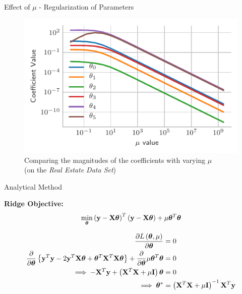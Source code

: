 \documentclass{beamer}
\begin{document}
\begin{frame}{Effect of $\mu$ - Regularization of Parameters}
\vspace{0.4cm}
\begin{figure}\includegraphics[width=0.8\linewidth]{../assets/ridge-regression/figures/rid_reg-with-lim.pdf}\caption{Comparing the magnitudes of the coefficients with varying $\mu$\\(on the \emph{Real Estate Data Set})}
\end{figure}
\end{frame}

\begin{frame}{Analytical Method}
\begin{tcolorbox}
\textbf{Ridge Objective:}
\vspace{-0.4cm}
$$
\min_{\boldsymbol{\theta}} \left(\mathbf{y}-\mathbf{X}\boldsymbol{\theta}\right)^T\left(\mathbf{y}-\mathbf{X}\boldsymbol{\theta}\right)+ \mu\boldsymbol{\theta}^T\boldsymbol{\theta}
$$
\end{tcolorbox}
\begin{align*}
\frac{\partial L\left(\boldsymbol{\theta}, \mu\right)}{\partial \boldsymbol{\theta}} &= 0 \\ 
\frac{\partial}{\partial \boldsymbol{\theta}}\left\lbrace \mathbf{y}^T\mathbf{y} - 2\mathbf{y}^T\mathbf{X}\boldsymbol{\theta} + \boldsymbol{\theta}^T\mathbf{X}^T\mathbf{X}\boldsymbol{\theta} \right\rbrace +  \frac{\partial}{\partial \boldsymbol{\theta}} \mu\boldsymbol{\theta}^T\boldsymbol{\theta} &= 0 \\
\implies -\mathbf{X}^T\mathbf{y} + \left(\mathbf{X}^T\mathbf{X} + \mu \mathbf{I}\right)\boldsymbol{\theta} &= 0 \\
\implies \boldsymbol{\theta}^* &= \left(\mathbf{X}^T\mathbf{X} + \mu \mathbf{I}\right)^{-1}\mathbf{X}^T\mathbf{y}
\end{align*}
\end{frame}
\end{document}
